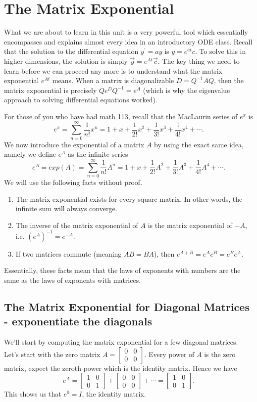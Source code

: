 \documentclass[10pt]{article}
\theoremstyle{plain}
\theoremstyle{box}
\begin{document}
\section{The Matrix Exponential}
What we are about to learn in this unit is a very powerful tool which essentially encompasses and explains almost every idea in an introductory ODE class.   Recall that the solution to the differential equation $y^\prime = ay$ is $y=e^{at}c$. To solve this in higher dimensions, the solution is simply $\vec y=e^{At}\vec c$.  The key thing we need to learn before we can proceed any more is to understand what the matrix exponential $e^{At}$ means. When a matrix is diagonalizable $D=Q^{-1} A Q$, then the matrix exponential is precisely $Qe^{D}Q^{-1}=e^{A}$ (which is why the eigenvalue approach to solving differential equations worked).

For those of you who have had math 113, recall that the MacLaurin series of $e^x$ is
$$e^x = \sum_{n=0}^\infty \frac{1}{n!}x^n = 1+x+\frac{1}{2!}x^2+\frac{1}{3!}x^3+\frac{1}{4!}x^4+\cdots.$$
We now introduce the exponential of a matrix $A$ by using the exact same idea, namely we define $e^A$ as the infinite series
$$e^A = exp(A) = \sum_{n=0}^\infty \frac{1}{n!}A^n = 1+x+\frac{1}{2!}A^2+\frac{1}{3!}A^3+\frac{1}{4!}A^4+\cdots.$$
We will use the following facts without proof.
\begin{enumerate}
	\item The matrix exponential exists for every square matrix. In other words, the infinite sum will always converge.
	\item The inverse of the matrix exponential of $A$ is the matrix exponential of $-A$, i.e. $(e^A)^{-1}=e^{-A}$. 
	\item If two matrices commute (meaning $AB=BA$), then  $e^{A+B}=e^Ae^B = e^Be^A$.
\end{enumerate}
Essentially, these facts mean that the laws of exponents with numbers are the same as the laws of exponents with matrices.


\subsection{The Matrix Exponential for Diagonal Matrices - exponentiate the diagonals}
We'll start by computing the matrix exponential for a few diagonal matrices.  Let's start with the zero matrix
$A=
\begin{bmatrix}
 0 & 0 \\
 0 & 0
	\end{bmatrix}
$. 
 Every power of $A$ is the zero matrix, expect the zeroth power which is the identity matrix.  Hence we have
$$e^A = 
\begin{bmatrix}
 1 & 0 \\
 0 & 1
	\end{bmatrix}
+
\begin{bmatrix}
 0 & 0 \\
 0 & 0
	\end{bmatrix}
+\cdots = 
\begin{bmatrix}
 1 & 0 \\
 0 & 1
	\end{bmatrix}
.$$
This shows us that $e^{0} = I$, the identity matrix.
\end{document}
